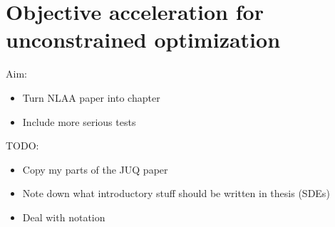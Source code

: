 \documentclass[main.tex]{subfiles}
\begin{document}
\chapter{Objective acceleration for unconstrained optimization}\label{ch:objaccel}


Aim:
\begin{itemize}
\item Turn NLAA paper into chapter
\item Include more serious tests
\end{itemize}

TODO:
\begin{itemize}
\item Copy my parts of the JUQ paper
\item Note down what introductory stuff should be written in thesis (SDEs)
\item Deal with notation
\end{itemize}

\biblio{} %
\end{document}
